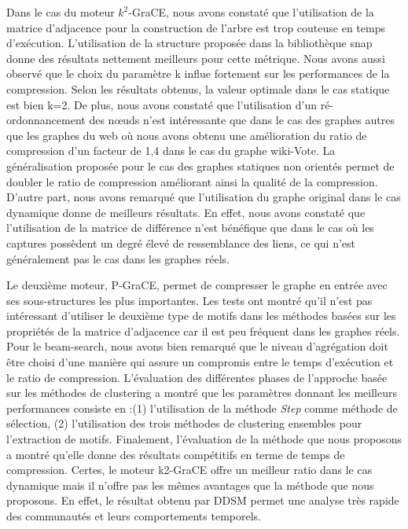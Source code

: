	Dans le cas du moteur $k^2$-GraCE, nous avons constaté que l'utilisation de la matrice d'adjacence pour la construction de l'arbre est trop couteuse en temps d'exécution. L'utilisation de la structure proposée dans la bibliothèque \gls{snap} donne des résultats nettement meilleurs pour cette métrique. Nous avons aussi observé que le choix du paramètre k influe fortement sur les performances de la compression. Selon les résultats obtenus, la valeur optimale dans le cas statique est bien k=2. De plus, nous avons constaté que l'utilisation d'un ré-ordonnancement des nœuds n'est intéressante que dans le cas des graphes autres que les graphes du web où nous avons obtenu une amélioration du ratio de compression d'un facteur de 1,4 dans le cas du graphe wiki-Vote. La généralisation  proposée pour le cas des graphes statiques non orientés permet de doubler le ratio de compression améliorant ainsi la qualité de la compression. D'autre part, nous avons remarqué que l'utilisation du graphe original dans le cas dynamique donne de meilleurs résultats. En effet, nous avons constaté que l'utilisation de la matrice de différence n'est bénéfique que dans le cas où les captures possèdent un degré élevé de ressemblance des liens, ce qui n'est généralement pas le cas dans les graphes réels.
	
	Le deuxième moteur, P-GraCE, permet de compresser le graphe en entrée avec ses sous-structures les plus importantes. Les tests ont montré qu'il n'est pas intéressant d'utiliser le deuxième type de motifs dans les méthodes basées sur les propriétés de la matrice d'adjacence car il est peu fréquent dans les graphes réels. Pour le beam-search, nous avons bien remarqué que le niveau d'agrégation doit être choisi d'une manière qui assure un compromis entre le temps d'exécution et le ratio de compression. L'évaluation des différentes phases de  l'approche basée sur les méthodes de clustering a montré que les paramètres donnant les meilleurs performances consiste en :(1) l'utilisation de la méthode \textit{Step} comme méthode de sélection, (2) l'utilisation des trois méthodes de clustering ensembles pour l'extraction de motifs. Finalement, l'évaluation de la méthode que nous proposons a montré qu'elle donne des résultats compétitifs en terme de temps de compression. Certes, le moteur k2-GraCE offre un meilleur ratio dans le cas dynamique mais il n'offre pas les mêmes avantages que la méthode que nous proposons. En effet, le résultat obtenu par DDSM permet une analyse très rapide des communautés et leurs comportements temporels.
	
